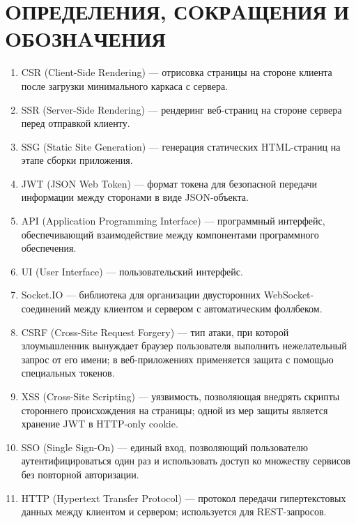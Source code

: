 \newpage
{}
\section*{OПРЕДЕЛЕНИЯ, СOКРAЩЕНИЯ И OБOЗНAЧЕНИЯ}
\setcounter{page}{4}

\begin{enumerate}
  \item CSR (Client-Side Rendering) — отрисовка страницы на стороне клиента после загрузки минимального каркаса с сервера.
  \item SSR (Server-Side Rendering) — рендеринг веб-страниц на стороне сервера перед отправкой клиенту.
  \item SSG (Static Site Generation) — генерация статических HTML-страниц на этапе сборки приложения.
  \item JWT (JSON Web Token) — формат токена для безопасной передачи информации между сторонами в виде JSON-объекта.
  \item API (Application Programming Interface) — программный интерфейс, обеспечивающий взаимодействие между компонентами программного обеспечения.
  \item UI (User Interface) — пользовательский интерфейс.
  \item Socket.IO — библиотека для организации двусторонних WebSocket-соединений между клиентом и сервером с автоматическим фоллбеком.
  \item CSRF (Cross-Site Request Forgery) — тип атаки, при которой злоумышленник вынуждает браузер пользователя выполнить нежелательный запрос от его имени; в веб-приложениях применяется защита с помощью специальных токенов.
  \item XSS (Cross-Site Scripting) — уязвимость, позволяющая внедрять скрипты стороннего происхождения на страницы; одной из мер защиты является хранение JWT в HTTP-only cookie.
  \item SSO (Single Sign-On) — единый вход, позволяющий пользователю аутентифицироваться один раз и использовать доступ ко множеству сервисов без повторной авторизации.
  \item HTTP (Hypertext Transfer Protocol) — протокол передачи гипертекстовых данных между клиентом и сервером; используется для REST-запросов.

\end{enumerate}
